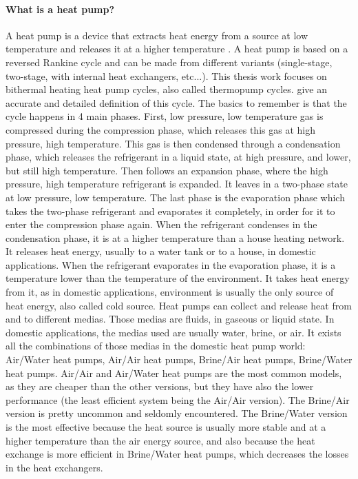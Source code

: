 \paragraph{What is a heat pump?}
A heat pump is a device that extracts heat
energy from a source at low
temperature and releases it at a higher temperature
\citep[based on def. p.\,607--608]{Borel-Favrat-2010a}. A heat pump is
based on a reversed Rankine cycle and can be made from different
variants (single-stage, two-stage, with internal heat exchangers,
etc...). This thesis work focuses on bithermal heating heat pump
cycles, also called thermopump
cycles. \citet[p.\,639--643]{Borel-Favrat-2010a} give an accurate and
detailed definition of this cycle. The basics to remember is that the
cycle happens in 4 main phases. First, low pressure, low temperature
gas is compressed during the compression phase, which releases this gas at high pressure, high
temperature. This gas is then condensed through a condensation
phase,
which releases the refrigerant in a liquid state, at high pressure,
and lower, but still high temperature. Then follows an expansion
phase, where the high pressure, high
temperature refrigerant is expanded. It leaves in a two-phase state at
low pressure, low temperature. The last phase is the evaporation
phase
which takes the two-phase refrigerant and evaporates it completely, in
order for it to enter the compression phase again. When the
refrigerant condenses in the condensation phase, it is at a higher
temperature than a house heating network. It releases heat
energy, usually to a water tank or to a house, in
domestic applications. When the refrigerant evaporates in the
evaporation phase, it is a temperature lower than the temperature of
the environment. It takes heat energy from it, as in domestic
applications, environment is usually the only source of heat energy,
also called cold source. Heat
pumps can collect and release heat from and to different medias. Those
medias are fluids, in gaseous or liquid state. In domestic
applications, the medias used are usually water, brine, or air. It exists
all the combinations of those medias in the domestic heat pump
world: Air/Water heat pumps, Air/Air
heat pumps, Brine/Air heat pumps, Brine/Water heat pumps. Air/Air and
Air/Water heat pumps are the most common models, as they are cheaper
than the other versions, but they have also the lower performance
(the least efficient system being the Air/Air version). The Brine/Air
version is pretty uncommon and seldomly encountered. The Brine/Water
version is the most effective because the heat source is usually more
stable and at a higher temperature than the air energy source, and
also because the heat exchange is more efficient in Brine/Water heat
pumps, which decreases the losses in the heat exchangers.

